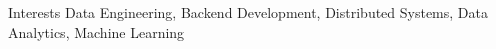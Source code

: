 

\begin{rubric}{Interests}
    \entry*[]
        Data Engineering, Backend Development, Distributed Systems, Data Analytics, Machine Learning
\end{rubric}

